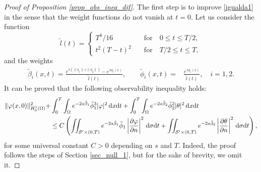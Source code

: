 \documentclass{aims}
\theoremstyle{definition}
\def\dx{\,\textnormal{d}x}
\def\dt{\textnormal{d}t}
\def\d{\,\textnormal{d}}
\begin{document}
\begin{proof}[Proof of Proposition \ref{prop_obs_ineq_dif}]
 The first step is to improve \eqref{igualda1} in the sense that the weight functions do not vanish at $t=0$. Let us consider the function
 \begin{equation*}
 \widetilde{l}(t)=
 \begin{cases}
 T^4/16 \quad &\text{for}\quad 0\leq t\leq T/2, \\
 t^2(T-t)^2 \quad &\text{for}\quad T/2\leq t\leq T,
 \end{cases}
 \end{equation*}
 and the weights
 \begin{equation*}
\begin{split}
\tilde{\beta}_i(x,t)=\frac{e^{\lambda(\|\eta_1\|+\|\eta_2\|)}-e^{\lambda \eta_i(x)}}{\widetilde{l}(t)}, \qquad \tilde{\phi}_i(x,t)=&\frac{e^{\lambda\eta_i(x)}}{\widetilde{l}(t)}, \quad i=1,2.
\end{split}\end{equation*}
It can be proved that the following observability inequality holds:
\begin{equation}
\label{aux7}
\begin{split}
\|\varphi(x,0)\|_{H_0^1(\Omega)}^2+&\int_0^{T}\int_{\Omega}e^{-2s\tilde \beta_1}\tilde \phi_1^{3}|\varphi|^2\dx\dt+\int_0^{T}\int_{\Omega}e^{-2s\tilde \beta_2}\tilde \phi_2^{2}|\theta|^2\dx\dt\\
&\leq C\left(\iint_{\mathcal S^\prime\times(0,T)}e^{-2s\tilde \beta_1}\tilde \phi_1\left|\frac{\partial \varphi}{\partial n}\right|^2\d\sigma\dt+\iint_{\mathcal S^{\prime}\times(0,T)}e^{-2s\tilde \beta_2}\left|\frac{\partial \theta}{\partial n}\right|^2\d\sigma\dt\right),
\end{split}
\end{equation}
 for some universal constant $C>0$ depending on $s$ and $T$. Indeed, the proof follows the steps of Section \ref{sec_null_1}, but for the sake of brevity, we omit it. 
 

\end{proof}
\end{document}
